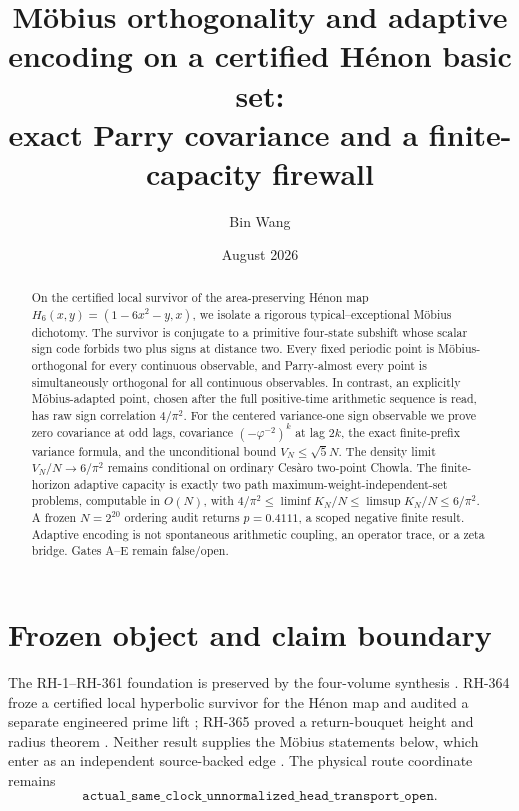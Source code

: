 \documentclass[11pt,a4paper]{article}
\title{M\"obius orthogonality and adaptive encoding on a certified H\'enon basic set:\\
exact Parry covariance and a finite-capacity firewall}
\author{Bin Wang}
\date{August 2026}
\theoremstyle{remark}
\newcommand{\Hmap}{H_6}
\begin{document}
\maketitle

\begin{abstract}
On the certified local survivor of the area-preserving H\'enon map
$\Hmap(x,y)=(1-6x^2-y,x)$, we isolate a rigorous typical--exceptional
M\"obius dichotomy.  The survivor is conjugate to a primitive four-state
subshift whose scalar sign code forbids two plus signs at distance two.
Every fixed periodic point is M\"obius-orthogonal for every continuous
observable, and Parry-almost every point is simultaneously orthogonal for
all continuous observables.  In contrast, an explicitly M\"obius-adapted
point, chosen after the full positive-time arithmetic sequence is read, has
raw sign correlation $4/\pi^2$.  For the centered variance-one sign
observable we prove zero covariance at odd lags, covariance
$(-\varphi^{-2})^k$ at lag $2k$, the exact finite-prefix variance formula,
and the unconditional bound $V_N\leq\sqrt5N$.  The density limit
$V_N/N\to6/\pi^2$ remains conditional on ordinary Ces\`aro two-point
Chowla.  The finite-horizon adaptive capacity is exactly two path
maximum-weight-independent-set problems, computable in $O(N)$, with
$4/\pi^2\leq\liminf K_N/N\leq\limsup K_N/N\leq6/\pi^2$.
A frozen $N=2^{20}$ ordering audit returns $p=0.4111$, a scoped negative
finite result.  Adaptive encoding is not spontaneous arithmetic coupling,
an operator trace, or a zeta bridge.  Gates A--E remain false/open.
\end{abstract}

\section{Frozen object and claim boundary}

The RH-1--RH-361 foundation is preserved by the four-volume synthesis
\cite{WangRHMVP22026}.  RH-364 froze a certified local hyperbolic survivor
for the H\'enon map and audited a separate engineered prime lift
\cite{WangRH3642026}; RH-365 proved a return-bouquet height and radius theorem
\cite{WangRH3652026}.  Neither result supplies the M\"obius statements below,
which enter as an independent source-backed edge
\cite{WangHenonMobius2026}.  The physical route coordinate remains
\begin{equation}
 \texttt{actual\_same\_clock\_unnormalized\_head\_transport\_open}.
 \label{eq:physical-coordinate}
\end{equation}
\end{document}
